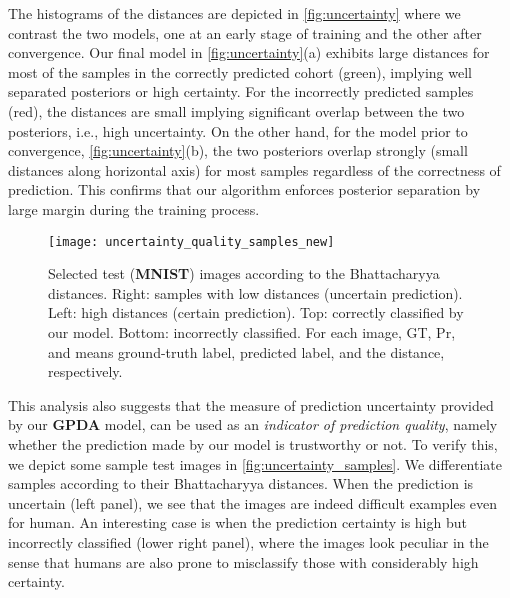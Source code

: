 \documentclass[10pt,letterpaper]{article}
\begin{document}
The histograms of the distances are depicted in \autoref{fig:uncertainty} where we contrast the two models, one at an early stage of training and the other after convergence.  Our final model in \autoref{fig:uncertainty}(a) exhibits large distances for most of the samples in the correctly predicted cohort (green), implying well separated posteriors or high certainty. For the incorrectly predicted samples (red), the distances are small implying significant overlap between the two posteriors, i.e., high uncertainty. 
On the other hand, for the model prior to convergence, \autoref{fig:uncertainty}(b), the two posteriors overlap strongly (small distances along horizontal axis) for most samples regardless of the correctness of prediction. This confirms that our algorithm enforces posterior separation by large margin during the training process. 
\begin{figure}[t!]
\vspace{-1.0em}
\begin{center}
\texttt{[image: uncertainty\_quality\_samples\_new]}
\end{center}
\vspace{-1.5em}
\caption{Selected test (\textbf{MNIST}) images according to the Bhattacharyya distances. Right: samples with low distances (uncertain prediction). Left: high distances (certain prediction). Top: correctly classified by our model. Bottom: incorrectly classified. For each image, GT, Pr, and  means ground-truth label, predicted label, and the distance, respectively.}
\label{fig:uncertainty_samples}
\end{figure}

This analysis also suggests that the measure of prediction uncertainty provided by our \textbf{GPDA} model, can be used as an {\em indicator of prediction quality}, namely whether the prediction made by our model is trustworthy or not. 
To verify this, we depict some sample test images in \autoref{fig:uncertainty_samples}. We differentiate samples according to their Bhattacharyya distances. When the prediction is uncertain (left panel), we see that the images are indeed difficult examples even for human. An interesting case is when the prediction certainty is high but incorrectly classified (lower right panel), where the images look peculiar in the sense that humans are also prone to misclassify those with considerably high certainty.
\end{document}
